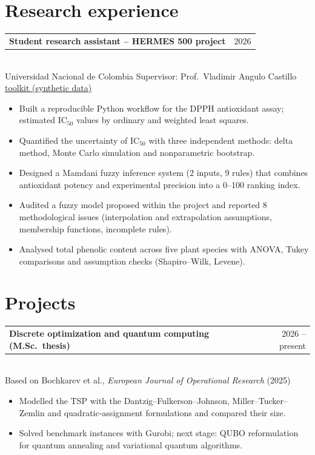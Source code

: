 \documentclass[11pt,a4paper]{article}
\makeatletter
\newcommand{\entry}[3]{%
  \begin{tabularx}{\textwidth}{@{}>{\raggedright\arraybackslash}X@{\hspace{1em}}r@{}}
    \textbf{#1} & {\color{gris}#2}
  \end{tabularx}\\
  {\color{gris}\small #3}\par\vspace{2pt}}
\makeatother
\begin{document}
\section{Research experience}
\entry{Student research assistant -- HERMES 500 project}{2026}{Universidad Nacional de Colombia
  \textperiodcentered{} Supervisor: Prof.\ Vladimir Angulo Castillo \textperiodcentered{}
  \href{https://github.com/Henry2899/ic50-uncertainty-toolkit}{toolkit (synthetic data)}}
\begin{itemize}
  \item Built a reproducible Python workflow for the DPPH antioxidant assay; estimated IC$_{50}$
        values by ordinary and weighted least squares.
  \item Quantified the uncertainty of IC$_{50}$ with three independent methods: delta method,
        Monte Carlo simulation and nonparametric bootstrap.
  \item Designed a Mamdani fuzzy inference system (2 inputs, 9 rules) that combines antioxidant
        potency and experimental precision into a 0--100 ranking index.
  \item Audited a fuzzy model proposed within the project and reported 8 methodological issues
        (interpolation and extrapolation assumptions, membership functions, incomplete rules).
  \item Analysed total phenolic content across five plant species with ANOVA, Tukey comparisons
        and assumption checks (Shapiro--Wilk, Levene).
\end{itemize}

\section{Projects}
\entry{Discrete optimization and quantum computing (M.Sc.\ thesis)}{2026 -- present}{Based on Bochkarev
  et al., \emph{European Journal of Operational Research} (2025)}
\begin{itemize}
  \item Modelled the TSP with the Dantzig--Fulkerson--Johnson, Miller--Tucker--Zemlin and
        quadratic-assignment formulations and compared their size.
  \item Solved benchmark instances with Gurobi; next stage: QUBO reformulation for quantum
        annealing and variational quantum algorithms.
\end{itemize}
\end{document}
